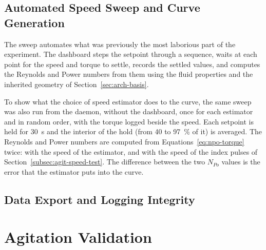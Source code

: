 \subsection{Automated Speed Sweep and Curve Generation}
\label{subsec:agit-sweep}

The sweep automates what was previously the most laborious part of the experiment. The dashboard steps the setpoint through a sequence, waits at each point for the speed and torque to settle, records the settled values, and computes the Reynolds and Power numbers from them using the fluid properties and the inherited geometry of Section~\ref{sec:arch-basis}.

To show what the choice of speed estimator does to the curve, the same sweep was also run from the daemon, without the dashboard, once for each estimator and in random order, with the torque logged beside the speed. Each setpoint is held for 30~s and the interior of the hold (from 40 to 97~\% of it) is averaged. The Reynolds and Power numbers are computed from Equations~\ref{eq:npo-torque} twice: with the speed of the estimator, and with the speed of the index pulses of Section~\ref{subsec:agit-speed-test}. The difference between the two $N_{Po}$ values is the error that the estimator puts into the curve.


\subsection{Data Export and Logging Integrity}
\label{subsec:agit-logging}



\section{Agitation Validation}
\label{sec:agit-validation}

